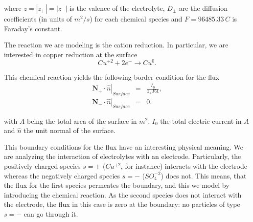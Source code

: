 where $z = |z_+|=|z_-|$ is the valence of the electrolyte, $D_{\pm}$ are the diffusion coefficients (in units of $m^2/s$) for each chemical species and $F = 96485.33\,C$ is Faraday's constant.

The reaction we are modeling is the cation reduction. In particular, we are interested in copper reduction at the surface
\begin{equation}
Cu^{+2} + 2 e^{-} \rightarrow Cu^{0}.
\end{equation}

This chemical reaction yields the following border condition for the flux
\begin{eqnarray}
\label{eq:boundary-condition-flux}
\left.\mathbf{N}_{+}\cdot\hat{n}\right|_{Surface} &=& \frac{I_{0}}{z_{+}FA},\nonumber\\
\left.\mathbf{N}_{-}\cdot\hat{n}\right|_{Surface} &=& 0.
\label{eq_bc1}
\end{eqnarray}

with $A$ being the total area of the surface in $m^2$, $I_{0}$ the total electric current in $A$ and $\hat{n}$ the unit normal of the surface.


This boundary conditions for the flux have an interesting physical meaning. We are analyzing the interaction of electrolytes with an electrode. Particularly, the positively charged species $s=+$ ($Cu^{+2}$, for instance) interacts with the electrode whereas the negatively charged species $s=-$ ($SO_4^{-2}$) does not. This means, that the flux for the first species permeates the boundary, and this we model by introducing the chemical reaction. As the second species does not interact with the electrode, the flux in this case is zero at the boundary: no particles of type $s=-$ can go through it.




